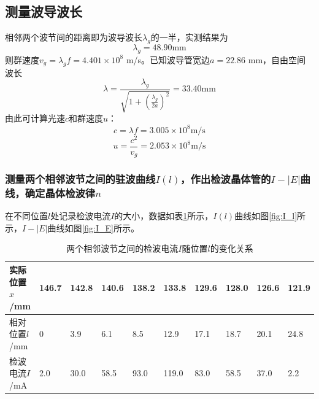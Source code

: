 \documentclass[aps,pre,12pt,preprint,onecolumn,showpacs,showkeys]{revtex4-1}
\begin{document}
        \subsection{测量波导波长}
        相邻两个波节间的距离即为波导波长$\lambda_g$的一半，实测结果为
        \begin{equation}
            \lambda_g=48.90 \mathrm{mm}
        \end{equation}
        则群速度$v_g=\lambda_g f=4.401\times 10^8$ m/s。已知波导管宽边$a=22.86$ mm，自由空间波长
        \begin{equation}
            \lambda=\frac{\lambda_g}{\sqrt{1+\left(\frac{\lambda_g}{2a}\right)^2}}=33.40 \mathrm{mm}
        \end{equation}
        由此可计算光速$c$和群速度$u$：
        \begin{equation}
            c=\lambda f=3.005\times 10^8 \mathrm{m/s}
        \end{equation}
        \begin{equation}
            u=\frac{c^2}{v_g}=2.053\times 10^8 \mathrm{m/s}
        \end{equation}

        \subsubsection{测量两个相邻波节之间的驻波曲线$I(l)$，作出检波晶体管的$I-|E|$曲线，确定晶体检波律$n$}
        在不同位置$l$处记录检波电流$I$的大小，数据如表\ref{tab:I_l}所示，$I(l)$曲线如图\ref{fig:I_l}所示，$I-|E|$曲线如图\ref{fig:I_E}所示。
        \begin{table}[h]
            \caption{\label{tab:I_l}%
            两个相邻波节之间的检波电流$I$随位置$l$的变化关系}
            \begin{tabular}{|l|l|l|l|l|l|l|l|l|l|}
                \hline
                实际位置$x$/mm&146.7&142.8&\textbf{140.6}&138.2&133.8&129.6&\textbf{128.0}&126.6&121.9\\\hline
                相对位置$l$/mm&0&3.9&6.1&8.5&12.9&17.1&18.7&20.1&24.8\\\hline
                检波电流$I$/mA&2.0&30.0&58.5&93.0&119.0&83.0&58.5&37.0&2.2\\\hline
            \end{tabular}
        \end{table}
\end{document}
